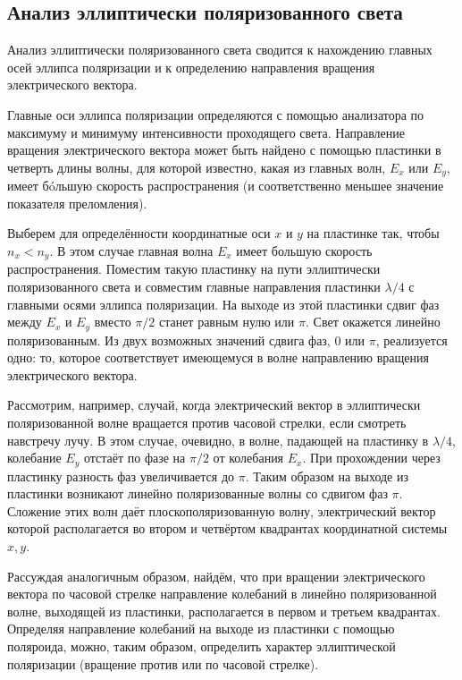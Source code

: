 \documentclass[a4paper,12pt]{article}
\begin{document}
\subsection*{Анализ эллиптически поляризованного света}

Анализ эллиптически поляризованного света сводится к нахождению главных осей
эллипса поляризации и к определению направления вращения электрического вектора.

Главные оси эллипса поляризации определяются с помощью анализатора по максимуму и минимуму интенсивности проходящего света.
Направление вращения электрического вектора может быть найдено с помощью пластинки в четверть длины волны, для которой известно, какая из главных волн, $ E_x $ или $ E_y $, имеет б\'{o}льшую скорость распространения (и соответственно меньшее значение показателя преломления).

Выберем для определённости координатные оси $x$ и $y$ на пластинке
так, чтобы $ n_x < n_y $. В этом случае главная волна $ E_x $ имеет большую
скорость распространения. Поместим такую пластинку на пути эллиптически поляризованного света и совместим главные направления пластинки $ \lambda/4 $ с главными осями эллипса поляризации. На выходе из этой пластинки сдвиг фаз между $ E_x $ и $ E_y $ вместо $ \pi/2 $ станет равным нулю или $ \pi $. Свет окажется линейно поляризованным. Из двух возможных значений сдвига фаз, 0 или $ \pi $, реализуется одно: то, которое соответствует имеющемуся в волне направлению вращения электрического вектора.

Рассмотрим, например, случай, когда электрический вектор в эллиптически поляризованной волне вращается против часовой стрелки,
если смотреть навстречу лучу. В этом случае, очевидно, в волне, падающей на пластинку в $ \lambda/4 $, колебание $ E_y $ отстаёт по фазе на $ \pi/2 $ от
колебания $ E_x $. При прохождении через пластинку разность фаз увеличивается до $ \pi $. Таким образом на выходе из пластинки возникают линейно поляризованные волны со сдвигом фаз $ \pi $. Сложение этих волн даёт плоскополяризованную волну, электрический вектор которой располагается во втором и четвёртом квадрантах координатной системы
$ x, y $.

Рассуждая аналогичным образом, найдём, что при вращении электрического вектора по часовой стрелке направление колебаний в линейно поляризованной волне, выходящей из пластинки, располагается в первом и третьем квадрантах. Определяя направление колебаний на выходе из пластинки с помощью поляроида, можно, таким образом, определить характер эллиптической поляризации (вращение против или по часовой стрелке).
\end{document}

